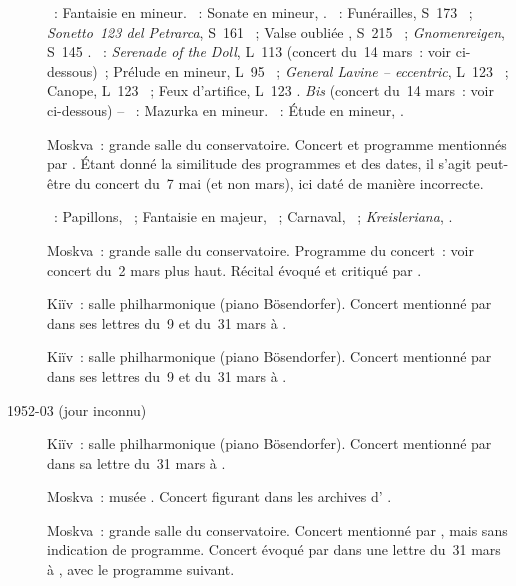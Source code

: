 \begin{description}
 \textsc{\Mozart{}}~: Fantaisie en \kC mineur.
 \textsc{\Beethoven{}}~: Sonate en \kC \Sharp mineur,  .
 \textsc{\Liszt{}}~: Funérailles, S~173 ~; \emph{Sonetto~123 del
 Petrarca}, S~161 ~; Valse oubliée , S~215 ~;
 \emph{Gnomenreigen}, S~145 .
 \textsc{\Debussy{}}~: \emph{Serenade of the Doll}, L~113 
 (concert du~14 mars~: voir ci-dessous)~; Prélude en \kA mineur, L~95
 ~; \emph{General Lavine -- eccentric}, L~123 ~;
 Canope, L~123 ~; Feux d'artifice, L~123 .
 \emph{Bis} (concert du~14 mars~: voir ci-dessous) -- \textsc{\Chopin{}}~:
 Mazurka en \kF mineur.
 \textsc{\Scriabine{}}~: Étude en \kB \Flat mineur, .
 \item[\DateWithWeekDay{1952-03-07}]
 Moskva~: grande salle du conservatoire.
 Concert et programme mentionnés par \citet[p.~173]{Nekrasova08}.
 Étant donné la similitude des programmes et des dates, il s'agit peut-être
 du concert du~7 mai (et non mars), ici daté de manière incorrecte.

 \textsc{\Schumann{}}~: Papillons, ~; Fantaisie en \kC majeur,
 ~; Carnaval, ~; \emph{Kreisleriana}, .
 \item[\DateWithWeekDay{1952-03-14}]
 Moskva~: grande salle du conservatoire.
 Programme du concert~: voir concert du~2 mars plus haut.
 Récital évoqué et critiqué par \citet{Aleksandrova52}.
 \item[\DateWithWeekDay{1952-03-20}]
 Kiïv~: salle philharmonique (piano Bösendorfer).
 Concert mentionné par \VSofronitsky{} dans ses lettres du~9 et du~31 mars à
 \AVizel{} \citep[p.~173]{Nekrasova08}.
 \item[\DateWithWeekDay{1952-03-22}]
 Kiïv~: salle philharmonique (piano Bösendorfer).
 Concert mentionné par \VSofronitsky{} dans ses lettres du~9 et du~31 mars à
 \AVizel{} \citep[p.~173]{Nekrasova08}.
 \item[1952-03 (jour inconnu)]
 Kiïv~: salle philharmonique (piano Bösendorfer).
 Concert mentionné par \VSofronitsky{} dans sa lettre du~31 mars à \AVizel{}
 \citep[p.~173]{Nekrasova08}.
 \item[\DateWithWeekDay{1952-04-04}]
 Moskva~: musée \Scriabine{}.
 Concert figurant dans les archives d'\AVizel{} \citep[p.~173]{Nekrasova08}.
 \item[\DateWithWeekDay{1952-04-07}]
 Moskva~: grande salle du conservatoire.
 Concert mentionné par \ASofronitsky{}, mais sans indication de programme.
 Concert évoqué par \VSofronitsky{} dans une lettre du~31 mars à \AVizel{}
 \citep[p.~173]{Nekrasova08}, avec le programme suivant.


\end{description}
